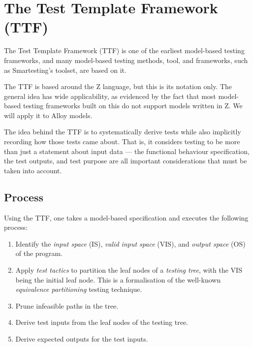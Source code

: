 \section{The Test Template Framework (TTF)}

The Test Template Framework (TTF) \cite{stocks96} is one of the earliest model-based testing frameworks, and many model-based testing methods, tool, and frameworks, such as Smartesting's toolset, are based on it.

The TTF is based around the Z language, but this is its notation only. The general idea has wide applicability, as evidenced by the fact that most model-based testing frameworks built on this do not support models written in Z. We will apply it to Alloy models.

The idea behind the TTF is to systematically derive tests while also implicitly recording how those tests came about. That is, it considers testing to be more than just a statement about input data --- the functional behaviour specification, the test outputs, and test purpose are all important considerations that must be taken into account.

\subsection{Process}

Using the TTF, one takes a model-based specification and executes the following process:

\begin{enumerate}

 \item Identify the {\em input space} (IS),  {\em valid input space} (VIS), and {\em output space} (OS) of the program.

 \item Apply {\em test tactics} to partition the leaf nodes of a {\em testing tree}, with the VIS being the initial leaf node. This is a formalisation of the well-known \emph{equivalence partitioning} testing technique.

 \item Prune infeasible paths in the tree.

 \item Derive test inputs from the leaf nodes of the testing tree.

 \item Derive expected outputs for the test inputs.

\end{enumerate}

